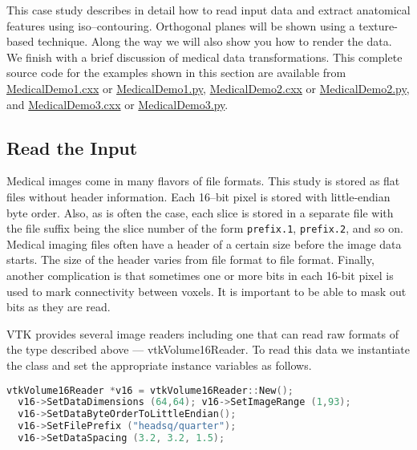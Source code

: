 This case study describes in detail how to read input data and extract anatomical features using iso--contouring. Orthogonal planes will be shown using a texture-based technique. Along the way we will also show you how to render the data. We finish with a brief discussion of medical data transformations. This complete source code for the examples shown in this section are available from 
\href{https://lorensen.github.io/VTKExamples/site/Cxx/Medical/MedicalDemo1/}{MedicalDemo1.cxx} or \href{https://lorensen.github.io/VTKExamples/site/Python/Medical/MedicalDemo1/}{MedicalDemo1.py}, 
\href{https://lorensen.github.io/VTKExamples/site/Cxx/Medical/MedicalDemo2/}{MedicalDemo2.cxx} or \href{https://lorensen.github.io/VTKExamples/site/Python/Medical/MedicalDemo2/}{MedicalDemo2.py}, and
\href{https://lorensen.github.io/VTKExamples/site/Cxx/Medical/MedicalDemo3/}{MedicalDemo3.cxx} or \href{https://lorensen.github.io/VTKExamples/site/Python/Medical/MedicalDemo3/}{MedicalDemo3.py}.

\subsection{Read the Input}

Medical images come in many flavors of file formats. This study is stored as flat files without header information. Each 16--bit pixel is stored with little-endian byte order. Also, as is often the case, each slice is stored in a separate file with the file suffix being the slice number of the form \texttt{prefix.1}, \texttt{prefix.2}, and so on. Medical imaging files often have a header of a certain size before the image data starts. The size of the header varies from file format to file format. Finally, another complication is that sometimes one or more bits in each 16-bit pixel is used to mark connectivity between voxels. It is important to be able to mask out bits as they are read.

VTK provides several image readers including one that can read raw formats of the type described above --- vtkVolume16Reader. To read this data we instantiate the class and set the appropriate instance variables as follows.

\begin{lstlisting}[language=C++, caption={Reading raw formatted files.}]
vtkVolume16Reader *v16 = vtkVolume16Reader::New();
  v16->SetDataDimensions (64,64); v16->SetImageRange (1,93);
  v16->SetDataByteOrderToLittleEndian();
  v16->SetFilePrefix ("headsq/quarter");
  v16->SetDataSpacing (3.2, 3.2, 1.5);
\end{lstlisting}


